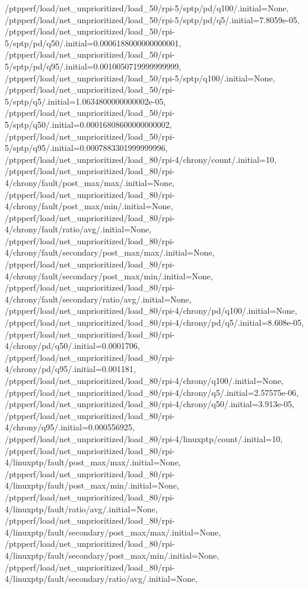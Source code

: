 {    /ptpperf/load/net_unprioritized/load_50/rpi-5/sptp/pd/q100/.initial=None,
    /ptpperf/load/net_unprioritized/load_50/rpi-5/sptp/pd/q5/.initial=7.8059e-05,
    /ptpperf/load/net_unprioritized/load_50/rpi-5/sptp/pd/q50/.initial=0.0006188000000000001,
    /ptpperf/load/net_unprioritized/load_50/rpi-5/sptp/pd/q95/.initial=0.0010050719999999999,
    /ptpperf/load/net_unprioritized/load_50/rpi-5/sptp/q100/.initial=None,
    /ptpperf/load/net_unprioritized/load_50/rpi-5/sptp/q5/.initial=1.0634800000000002e-05,
    /ptpperf/load/net_unprioritized/load_50/rpi-5/sptp/q50/.initial=0.00016808600000000002,
    /ptpperf/load/net_unprioritized/load_50/rpi-5/sptp/q95/.initial=0.0007883301999999996,
    /ptpperf/load/net_unprioritized/load_80/rpi-4/chrony/count/.initial=10,
    /ptpperf/load/net_unprioritized/load_80/rpi-4/chrony/fault/post_max/max/.initial=None,
    /ptpperf/load/net_unprioritized/load_80/rpi-4/chrony/fault/post_max/min/.initial=None,
    /ptpperf/load/net_unprioritized/load_80/rpi-4/chrony/fault/ratio/avg/.initial=None,
    /ptpperf/load/net_unprioritized/load_80/rpi-4/chrony/fault/secondary/post_max/max/.initial=None,
    /ptpperf/load/net_unprioritized/load_80/rpi-4/chrony/fault/secondary/post_max/min/.initial=None,
    /ptpperf/load/net_unprioritized/load_80/rpi-4/chrony/fault/secondary/ratio/avg/.initial=None,
    /ptpperf/load/net_unprioritized/load_80/rpi-4/chrony/pd/q100/.initial=None,
    /ptpperf/load/net_unprioritized/load_80/rpi-4/chrony/pd/q5/.initial=8.608e-05,
    /ptpperf/load/net_unprioritized/load_80/rpi-4/chrony/pd/q50/.initial=0.0001706,
    /ptpperf/load/net_unprioritized/load_80/rpi-4/chrony/pd/q95/.initial=0.001181,
    /ptpperf/load/net_unprioritized/load_80/rpi-4/chrony/q100/.initial=None,
    /ptpperf/load/net_unprioritized/load_80/rpi-4/chrony/q5/.initial=2.57575e-06,
    /ptpperf/load/net_unprioritized/load_80/rpi-4/chrony/q50/.initial=3.913e-05,
    /ptpperf/load/net_unprioritized/load_80/rpi-4/chrony/q95/.initial=0.000556925,
    /ptpperf/load/net_unprioritized/load_80/rpi-4/linuxptp/count/.initial=10,
    /ptpperf/load/net_unprioritized/load_80/rpi-4/linuxptp/fault/post_max/max/.initial=None,
    /ptpperf/load/net_unprioritized/load_80/rpi-4/linuxptp/fault/post_max/min/.initial=None,
    /ptpperf/load/net_unprioritized/load_80/rpi-4/linuxptp/fault/ratio/avg/.initial=None,
    /ptpperf/load/net_unprioritized/load_80/rpi-4/linuxptp/fault/secondary/post_max/max/.initial=None,
    /ptpperf/load/net_unprioritized/load_80/rpi-4/linuxptp/fault/secondary/post_max/min/.initial=None,
    /ptpperf/load/net_unprioritized/load_80/rpi-4/linuxptp/fault/secondary/ratio/avg/.initial=None,
}
